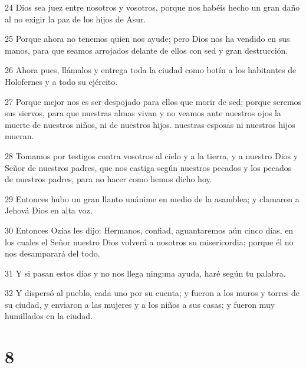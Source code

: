 \par 24 Dios sea juez entre nosotros y vosotros, porque nos habéis hecho un gran daño al no exigir la paz de los hijos de Asur.
\par 25 Porque ahora no tenemos quien nos ayude; pero Dios nos ha vendido en sus manos, para que seamos arrojados delante de ellos con sed y gran destrucción.
\par 26 Ahora pues, llámalos y entrega toda la ciudad como botín a los habitantes de Holofernes y a todo su ejército.
\par 27 Porque mejor nos es ser despojado para ellos que morir de sed; porque seremos sus siervos, para que nuestras almas vivan y no veamos ante nuestros ojos la muerte de nuestros niños, ni de nuestros hijos. nuestras esposas ni nuestros hijos mueran.
\par 28 Tomamos por testigos contra vosotros al cielo y a la tierra, y a nuestro Dios y Señor de nuestros padres, que nos castiga según nuestros pecados y los pecados de nuestros padres, para no hacer como hemos dicho hoy.
\par 29 Entonces hubo un gran llanto unánime en medio de la asamblea; y clamaron a Jehová Dios en alta voz.
\par 30 Entonces Ozías les dijo: Hermanos, confiad, aguantaremos aún cinco días, en los cuales el Señor nuestro Dios volverá a nosotros su misericordia; porque él no nos desamparará del todo.
\par 31 Y si pasan estos días y no nos llega ninguna ayuda, haré según tu palabra.
\par 32 Y dispersó al pueblo, cada uno por su cuenta; y fueron a los muros y torres de su ciudad, y enviaron a las mujeres y a los niños a sus casas; y fueron muy humillados en la ciudad.

\chapter{8}

